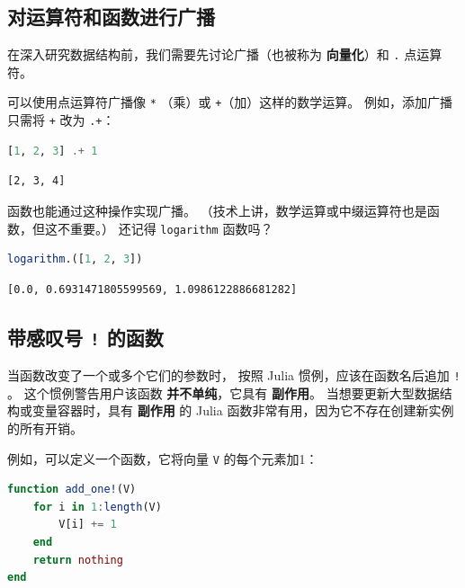 \documentclass[
  notoc %
]{tufte-book}
\newcommand{\passthrough}[1]{#1}
\begin{document}
\hypertarget{sec:broadcasting}{%
\subsection{对运算符和函数进行广播}\label{sec:broadcasting}}

在深入研究数据结构前，我们需要先讨论广播（也被称为 \textbf{向量化}）和
\passthrough{\lstinline!.!} 点运算符。

可以使用点运算符广播像 \passthrough{\lstinline!*!} （乘）或
\passthrough{\lstinline!+!}（加）这样的数学运算。 例如，添加广播只需将
\passthrough{\lstinline!+!} 改为 \passthrough{\lstinline!.+!}：

\begin{lstlisting}[language=Julia]
[1, 2, 3] .+ 1
\end{lstlisting}

\begin{lstlisting}[language=Output]
[2, 3, 4]
\end{lstlisting}

函数也能通过这种操作实现广播。
（技术上讲，数学运算或中缀运算符也是函数，但这不重要。） 还记得
\passthrough{\lstinline!logarithm!} 函数吗？

\begin{lstlisting}[language=Julia]
logarithm.([1, 2, 3])
\end{lstlisting}

\begin{lstlisting}[language=Output]
[0.0, 0.6931471805599569, 1.0986122886681282]
\end{lstlisting}

\hypertarget{sec:function_bang}{%
\subsection{\texorpdfstring{带感叹号 \texttt{!}
的函数}{带感叹号 ! 的函数}}\label{sec:function_bang}}

当函数改变了一个或多个它们的参数时， 按照 Julia 惯例，应该在函数名后追加
\passthrough{\lstinline"!"} 。 这个惯例警告用户该函数
\textbf{并不单纯}，它具有 \textbf{副作用}。
当想要更新大型数据结构或变量容器时，具有 \textbf{副作用} 的 Julia
函数非常有用，因为它不存在创建新实例的所有开销。

例如，可以定义一个函数，它将向量 \passthrough{\lstinline!V!}
的每个元素加1：

\begin{lstlisting}[language=Julia]
function add_one!(V)
    for i in 1:length(V)
        V[i] += 1
    end
    return nothing
end
\end{lstlisting}
\end{document}
